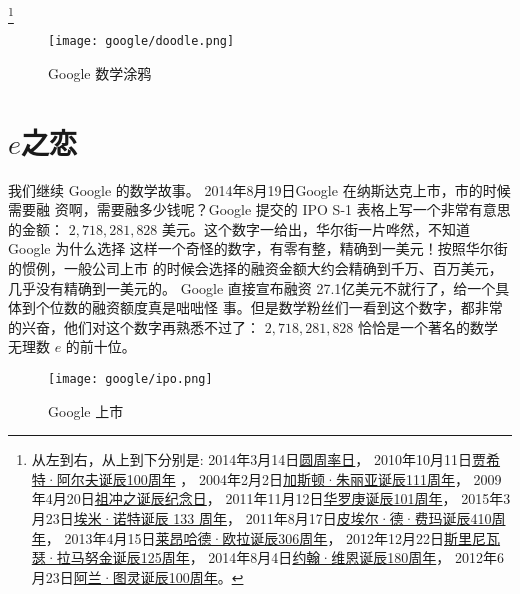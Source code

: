 \footnote{
从左到右，从上到下分别是:
2014年3月14日\href{http://www.google.com/doodles/pi-day?hl=zh-CN}{圆周率日}，
2010年10月11日\href{http://www.google.com/doodles/cahit-arfs-100th-birthday?hl=zh-CN}{贾希特·阿尔夫诞辰100周年} ，
2004年2月2日\href{http://www.google.com/doodles/gaston-julias-111th-birthday?hl=zh-CN}{加斯顿·朱丽亚诞辰111周年}，
2009年4月20日\href{http://www.google.com/doodles/zu-chongzhis-birthday?hl=zh-CN}{祖冲之诞辰纪念日}，
2011年11月12日\href{http://www.google.com/doodles/hua-luogengs-101st-birthday?hl=zh-CN}{华罗庚诞辰101周年}，
2015年3月23日\href{http://www.google.com/doodles/emmy-noethers-133rd-birthday?hl=zh-CN}{埃米·诺特诞辰 133 周年}，
2011年8月17日\href{http://www.google.com/doodles/pierre-de-fermats-410th-birthday?hl=zh-CN}{皮埃尔·德·费玛诞辰410周年}，
2013年4月15日\href{http://www.google.com/doodles/leonhard-eulers-306th-birthday?hl=zh-CN}{莱昂哈德·欧拉诞辰306周年}，
2012年12月22日\href{http://www.google.com/doodles/srinivasa-ramanujans-125th-birthday?hl=zh-CN}{斯里尼瓦瑟·拉马努金诞辰125周年}，
2014年8月4日\href{http://www.google.com/doodles/john-venns-180th-birthday?hl=zh-CN}{约翰·维恩诞辰180周年}，
2012年6月23日\href{http://www.google.com/doodles/alan-turings-100th-birthday?hl=zh-CN}{阿兰·图灵诞辰100周年}。
}

\begin{figure}[htbp]
\centering
\texttt{[image: google/doodle.png]}
\caption{Google 数学涂鸦}
\centering
\end{figure}


\section{$e$之恋}

我们继续 Google 的数学故事。 2014年8月19日Google 在纳斯达克上市，市的时候需要融
资啊，需要融多少钱呢？Google 提交的 IPO S-1 表格上写一个非常有意思的金额：
$2,718,281,828$ 美元。这个数字一给出，华尔街一片哗然，不知道 Google 为什么选择
这样一个奇怪的数字，有零有整，精确到一美元！按照华尔街的惯例，一般公司上市
的时候会选择的融资金额大约会精确到千万、百万美元，几乎没有精确到一美元的。
Google 直接宣布融资 27.1亿美元不就行了，给一个具体到个位数的融资额度真是咄咄怪
事。但是数学粉丝们一看到这个数字，都非常的兴奋，他们对这个数字再熟悉不过了：
$2,718,281,828$ 恰恰是一个著名的数学无理数 $e$ 的前十位。


\begin{figure}[htbp]
\centering
\texttt{[image: google/ipo.png]}
\caption{Google 上市}
\centering
\end{figure}


